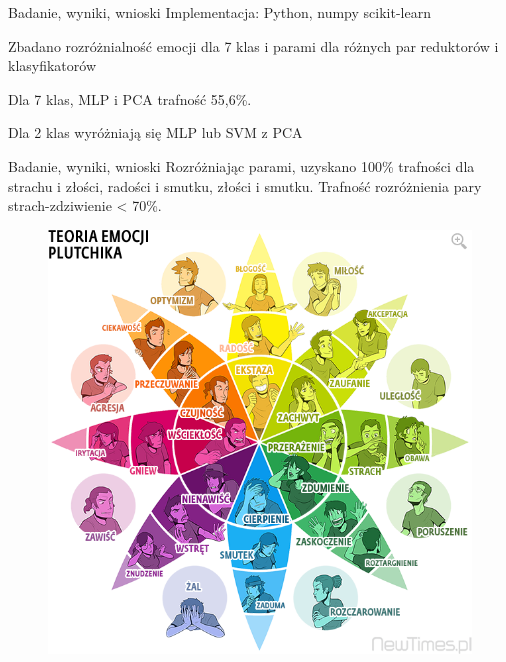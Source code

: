 \documentclass{beamer}
\begin{document}
\begin{frame}[t,fragile]{Badanie, wyniki, wnioski}
Implementacja: Python, numpy scikit-learn

Zbadano rozróżnialność emocji dla 7 klas i parami dla różnych par reduktorów i klasyfikatorów

Dla 7 klas, MLP i PCA trafność 55,6\%.

Dla 2 klas wyróżniają się MLP lub SVM z PCA
\end{frame}
\begin{frame}[t,fragile]{Badanie, wyniki, wnioski}
Rozróżniając parami, uzyskano 100\% trafności dla strachu i złości, radości i smutku, złości i smutku.
Trafność rozróżnienia pary  strach-zdziwienie < 70\%.
  \begin{figure}
   \centering
   \includegraphics[height = 0.4\textwidth]{./plutchik}
  \end{figure}
\end{frame}
\end{document}
